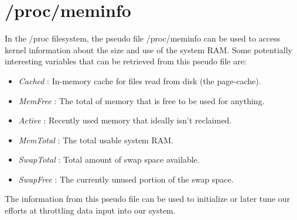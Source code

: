 \section{/proc/meminfo}
In the /proc filesystem, the pseudo file /proc/meminfo can be used to access kernel information about the size and use of the system RAM. Some potentially interesting variables that can be retrieved from this pseudo file are:
\begin{itemize}
\item \emph{Cached} : In-memory cache for files read from disk (the page-cache).
\item \emph{MemFree} : The total of memory that is free to be used for anything.
\item \emph{Active} : Recently used memory that ideally isn't reclaimed.
\item \emph{MemTotal} : The total usable system RAM.
\item \emph{SwapTotal} : Total amount of swap space available.
\item \emph{SwapFree} : The currently unused portion of the swap space.
\end{itemize}
The information from this pseudo file can be used to initialize or later tune our efforts at throttling data input into our system. 
